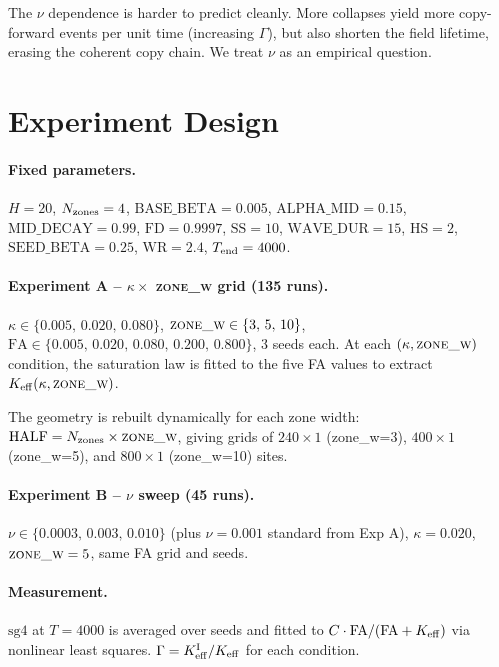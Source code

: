 \documentclass[11pt,a4paper]{article}
\begin{document}
The $\nu$ dependence is harder to predict cleanly.  More collapses yield more
copy-forward events per unit time (increasing $\Gamma$), but also shorten the field
lifetime, erasing the coherent copy chain.  We treat $\nu$ as an empirical question.

\section{Experiment Design}
\label{sec:design}

\paragraph{Fixed parameters.}
$H=20$, $N_{\rm zones}=4$, $\mathrm{BASE\_BETA}=0.005$, $\mathrm{ALPHA\_MID}=0.15$,
$\mathrm{MID\_DECAY}=0.99$, $\mathrm{FD}=0.9997$, $\mathrm{SS}=10$,
$\mathrm{WAVE\_DUR}=15$, $\mathrm{HS}=2$, $\mathrm{SEED\_BETA}=0.25$,
$\mathrm{WR}=2.4$, $T_{\rm end}=4000$.

\paragraph{Experiment A -- $\kappa \times$ \textsc{zone\_w} grid (135 runs).}
$\kappa \in \{0.005,\, 0.020,\, 0.080\}$,
$\textsc{zone\_w} \in \{3,\, 5,\, 10\}$,
$\mathrm{FA} \in \{0.005,\, 0.020,\, 0.080,\, 0.200,\, 0.800\}$,
3 seeds each.
At each $(\kappa, \textsc{zone\_w})$ condition, the saturation law is fitted to the
five FA values to extract $K_{\rm eff}(\kappa, \textsc{zone\_w})$.

The geometry is rebuilt dynamically for each zone width:
$\mathrm{HALF} = N_{\rm zones} \times \textsc{zone\_w}$, giving grids of
$240 \times 1$ (zone\_w=3), $400 \times 1$ (zone\_w=5), and $800 \times 1$ (zone\_w=10)
sites.

\paragraph{Experiment B -- $\nu$ sweep (45 runs).}
$\nu \in \{0.0003,\, 0.003,\, 0.010\}$ (plus $\nu=0.001$ standard from Exp A),
$\kappa=0.020$, $\textsc{zone\_w}=5$, same FA grid and seeds.

\paragraph{Measurement.}
$\mathrm{sg4}$ at $T=4000$ is averaged over seeds and fitted to
$C \cdot \mathrm{FA}/(\mathrm{FA}+K_{\rm eff})$ via nonlinear least squares.
$\Gamma = K_{\rm eff}^{\rm I}/K_{\rm eff}$ for each condition.
\end{document}
